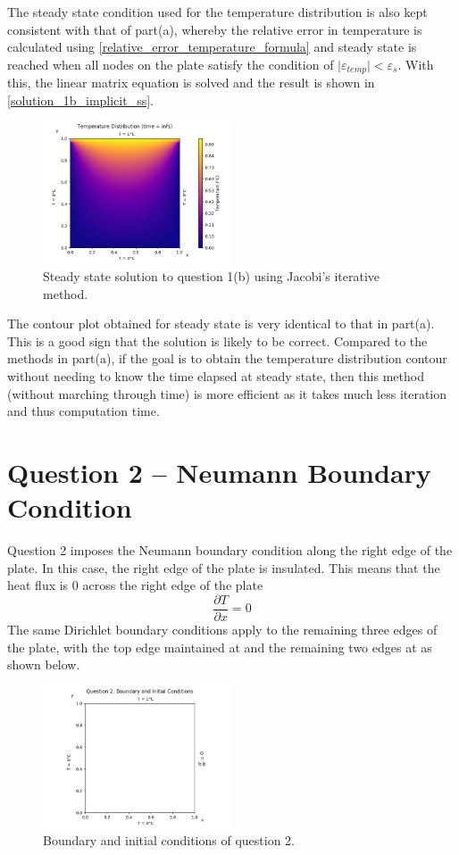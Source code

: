 \documentclass[a4paper]{article}
\begin{document}
	The steady state condition used for the temperature distribution is also kept consistent with that of part(a), whereby the relative error in temperature is calculated using \autoref{relative_error_temperature_formula} and steady state is reached when all nodes on the plate satisfy the condition of $\vert\varepsilon_{temp}\vert < \varepsilon_s$. With this, the linear matrix equation is solved and the result is shown in \autoref{solution_1b_implicit_ss}.
	\begin{figure}[H]
		\centering
		\includegraphics[width=0.5\textwidth]{figures/1b/t=inf}
		\caption{Steady state solution to question 1(b) using Jacobi's iterative method.}
		\label{solution_1b_implicit_ss}
	\end{figure}
	
	The contour plot obtained for steady state is very identical to that in part(a). This is a good sign that the solution is likely to be correct. Compared to the methods in part(a), if the goal is to obtain the temperature distribution contour without needing to know the time elapsed at steady state, then this method (without marching through time) is more efficient as it takes much less iteration and thus computation time.
	
\section{Question 2 -- Neumann Boundary Condition}
	Question 2 imposes the Neumann boundary condition along the right edge of the plate. In this case, the right edge of the plate is insulated. This means that the heat flux is 0 across the right edge of the plate
	$$ \frac{\partial T}{\partial x} = 0 $$	
	The same Dirichlet boundary conditions apply to the remaining three edges of the plate, with the top edge maintained at  and the remaining two edges at  as shown below.
	\begin{figure}[H]
		\centering
		\includegraphics[width=0.5\textwidth]{figures/question2_initial}
		\caption{Boundary and initial conditions of question 2.}
		\label{question2_initial}
	\end{figure}
	
\end{document}
